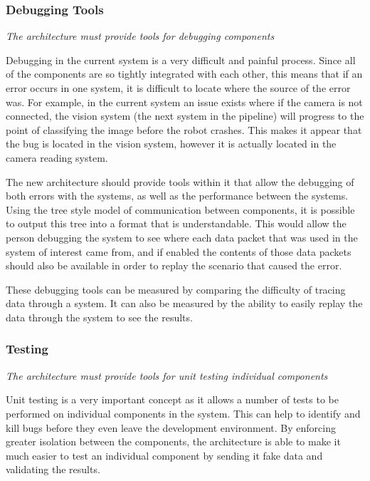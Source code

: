 \documentclass[english,12pt]{scrartcl}
\newcommand{\requirement}[1]{\textit{#1}}
\begin{document}
			\subsubsection{Debugging Tools}
				\requirement{The architecture must provide tools for debugging components}
	
				Debugging in the current system is a very difficult and painful process. Since all of
				the components are so tightly integrated with each other, this means that if an error
				occurs in one system, it is difficult to locate where the source of the error was. For
				example, in the current system an issue exists where if the camera is not connected, the
				vision system (the next system in the pipeline) will progress to the point of
				classifying the image before the robot crashes. This makes it appear that the bug is
				located in the vision system, however it is actually located in the camera reading
				system.
	
				The new architecture should provide tools within it that allow the debugging of both
				errors with the systems, as well as the performance between the systems. Using the tree
				style model of communication between components, it is possible to output this tree into
				a format that is understandable. This would allow the person debugging the system to see
				where each data packet that was used in the system of interest came from, and if enabled
				the contents of those data packets should also be available in order to replay the
				scenario that caused the error.
	
				These debugging tools can be measured by comparing the difficulty of tracing data through a system. It can also be measured by the ability to easily replay the data through the system to see the results.

			\subsubsection{Testing}
				\requirement{The architecture must provide tools for unit testing individual components}
	
				Unit testing is a very important concept as it allows a number of tests to be performed
				on individual components in the system. This can help to identify and kill bugs before
				they even leave the development environment. By enforcing greater isolation between the
				components, the architecture is able to make it much easier to test an individual
				component by sending it fake data and validating the results.
	
\end{document}
